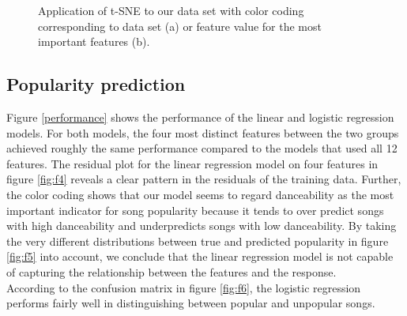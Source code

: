 \documentclass{article}
\begin{document}
\begin{figure}[!h]
  \centering
  \caption{Application of t-SNE to our data set with color coding corresponding to data set (a) or feature value for the most important features (b).}
\end{figure}

\subsection{Popularity prediction}

Figure \ref{performance} shows the performance of the linear and logistic regression models. For both models, the four most distinct features between the two groups achieved roughly the same performance compared to the models that used all 12 features. The residual plot for the linear regression model on four features in figure \ref{fig:f4} reveals a clear pattern in the residuals of the training data. Further, the color coding shows that our model seems to regard danceability as the most important indicator for song popularity because it tends to over predict songs with high danceability and underpredicts songs with low danceability. By taking the very different distributions between true and predicted popularity in figure \ref{fig:f5} into account, we conclude that the linear regression model is not capable of capturing the relationship between the features and the response. \\
According to the confusion matrix in figure \ref{fig:f6}, the logistic regression performs fairly well in distinguishing between popular and unpopular songs. 
\end{document}
